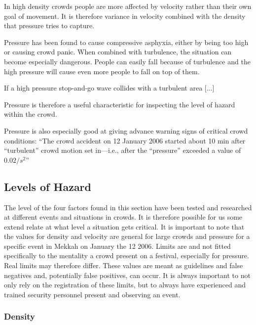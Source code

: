 In high density crowds people are more affected by velocity rather than their own goal of movement. It is therefore variance in velocity combined with the density that pressure tries to capture.

Pressure has been found to cause compressive asphyxia, either by being too high or causing crowd panic. When combined with turbulence, the situation can become especially dangerous. People can easily fall because of turbulence and the high pressure will cause even more people to fall on top of them.

If a high pressure stop-and-go wave collides with a turbulent area [...]

Pressure is therefore a useful characteristic for inspecting the level of hazard within the crowd.

Pressure is also especially good at giving advance warning signs of critical crowd conditions: \enquote{The crowd accident on 12 January 2006 started about 10 min after “turbulent” crowd motion set in—i.e., after the “pressure” exceeded a value of $0.02/s^2$}

\subsection{Levels of Hazard}
\label{subsec:levelsOfHazard}
The level of the four factors found in this section have been tested and researched at different events and situations in crowds. It is therefore possible for us some extend relate at what level a situation gets critical. It is important to note that the values for density and velocity are general for large crowds and pressure for a specific event in Mekkah on January the 12 2006. Limits are and not fitted specifically to the mentality a crowd present on a festival, especially for pressure. Real limits may therefore differ. These values are meant as guidelines and false negatives and, potentially false positives, can occur. It is always important to not only rely on the registration of these limits, but to always have experienced and trained security personnel present and observing an event.

\subsubsection{Density}


